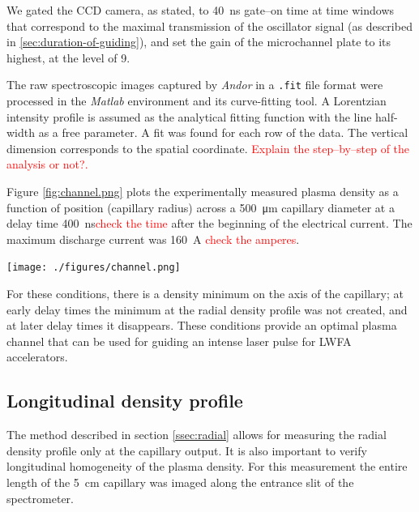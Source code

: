 \documentclass[justified,nofonts,nobib]{tufte-book}
\begin{document}
We gated the CCD camera, as stated, to \SI{40}{\ns} gate--on time at time windows that correspond to the maximal transmission of the oscillator signal (as described in \ref{sec:duration-of-guiding}), and set the gain of the microchannel plate to its highest, at the level of 9.

The raw spectroscopic images captured by \textit{Andor} in a \texttt{.fit} file format were processed in the \textit{Matlab} environment and its curve-fitting tool. A Lorentzian intensity profile is assumed as the analytical fitting function with the line half-width as a free parameter. A fit was found for each row of the data. The vertical dimension corresponds to the spatial coordinate. \textcolor{red}{Explain the step--by--step of the analysis or not?.}

Figure \ref{fig:channel.png} plots the experimentally measured plasma density as a function of position (capillary radius) across a \SI{500}{\um} capillary diameter at a delay time \SI{400}{\ns}\textcolor{red}{check the time} after the beginning of the electrical current. The maximum discharge current was \SI{160}{\A} \textcolor{red}{check the amperes}.

	\begin{marginfigure}
	    \texttt{[image: ./figures/channel.png]}
	    \caption{Radial density profile of the plasma from the measured spectrum, \SI{400}{\ns} \textcolor{red}{check the number} after the beginning of the current.}
	    \label{fig:plasma_channel_spectro}
	\end{marginfigure}

For these conditions, there is a density minimum on the axis of the capillary; at early delay times the minimum at the radial density profile was not created, and at later delay times it disappears. These conditions provide an optimal plasma channel that can be used for guiding an intense laser pulse for LWFA accelerators.

\subsection{Longitudinal density profile}\label{ssec:longi}

The method described in section \ref{ssec:radial} allows for measuring the radial density profile only at the capillary output. It is also important to verify longitudinal homogeneity of the plasma density. For this measurement the entire length of the \SI{5}{\cm} capillary was imaged along the entrance slit of the spectrometer.
\end{document}
